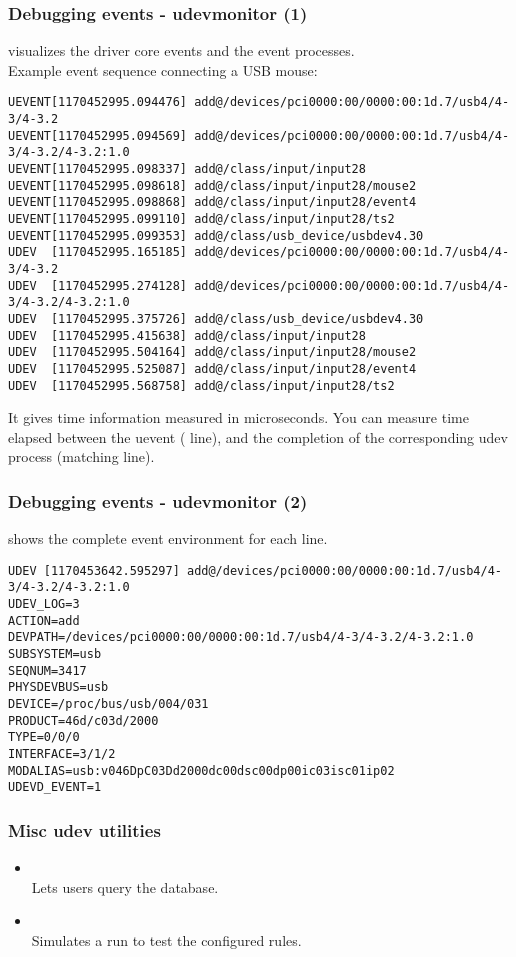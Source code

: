 \begin{frame}[fragile]
  \frametitle{Debugging events - udevmonitor (1)}
   visualizes the driver core events and the  event processes.\\
  Example event sequence connecting a USB mouse:
  \begin{block}{}
\tiny
\begin{verbatim}
UEVENT[1170452995.094476] add@/devices/pci0000:00/0000:00:1d.7/usb4/4-3/4-3.2
UEVENT[1170452995.094569] add@/devices/pci0000:00/0000:00:1d.7/usb4/4-3/4-3.2/4-3.2:1.0
UEVENT[1170452995.098337] add@/class/input/input28
UEVENT[1170452995.098618] add@/class/input/input28/mouse2
UEVENT[1170452995.098868] add@/class/input/input28/event4
UEVENT[1170452995.099110] add@/class/input/input28/ts2
UEVENT[1170452995.099353] add@/class/usb_device/usbdev4.30
UDEV  [1170452995.165185] add@/devices/pci0000:00/0000:00:1d.7/usb4/4-3/4-3.2
UDEV  [1170452995.274128] add@/devices/pci0000:00/0000:00:1d.7/usb4/4-3/4-3.2/4-3.2:1.0
UDEV  [1170452995.375726] add@/class/usb_device/usbdev4.30
UDEV  [1170452995.415638] add@/class/input/input28
UDEV  [1170452995.504164] add@/class/input/input28/mouse2
UDEV  [1170452995.525087] add@/class/input/input28/event4
UDEV  [1170452995.568758] add@/class/input/input28/ts2
\end{verbatim}
\end{block}
It gives time information measured in microseconds. You can measure
time elapsed between the uevent ( line), and the completion of
the corresponding udev process (matching  line).
\end{frame}

\begin{frame}[fragile]
\frametitle{Debugging events - udevmonitor (2)}
 shows the complete event environment for each line.
\begin{block}{}
\tiny
\begin{verbatim}
UDEV [1170453642.595297] add@/devices/pci0000:00/0000:00:1d.7/usb4/4-3/4-3.2/4-3.2:1.0
UDEV_LOG=3
ACTION=add
DEVPATH=/devices/pci0000:00/0000:00:1d.7/usb4/4-3/4-3.2/4-3.2:1.0
SUBSYSTEM=usb
SEQNUM=3417
PHYSDEVBUS=usb
DEVICE=/proc/bus/usb/004/031
PRODUCT=46d/c03d/2000
TYPE=0/0/0
INTERFACE=3/1/2
MODALIAS=usb:v046DpC03Dd2000dc00dsc00dp00ic03isc01ip02
UDEVD_EVENT=1
\end{verbatim}
\end{block}
\end{frame}

\begin{frame}
  \frametitle{Misc udev utilities}
  \begin{itemize}
  \item {}\\
    Lets users query the  database.
  \item {} \\
    Simulates a  run to test the configured rules.
  \end{itemize}
\end{frame}


